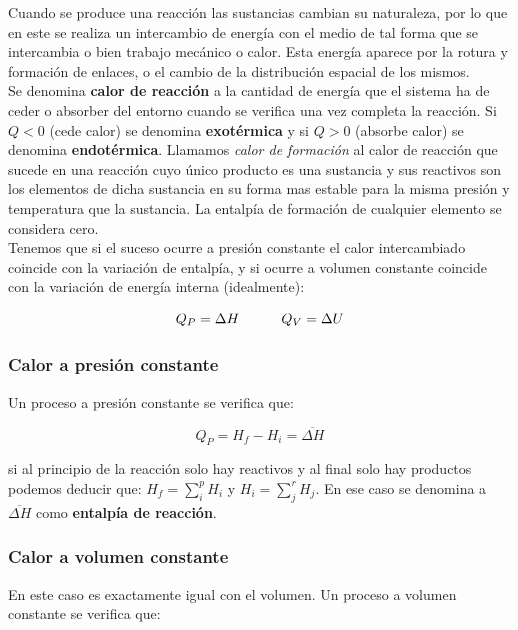 \documentclass[12pt,a4paper,oneside]{book}
\begin{document}
Cuando se produce una reacción las sustancias cambian su naturaleza, por lo que en este se realiza un intercambio de energía con el medio de tal forma que se intercambia o bien trabajo mecánico o calor. Esta energía aparece por la rotura y formación de enlaces, o el cambio de la distribución espacial de los mismos. \\

Se denomina \textbf{calor de reacción} a la cantidad de energía que el sistema ha de ceder o absorber del entorno cuando se verifica una vez completa la reacción. Si $Q<0$ (cede calor) se denomina \textbf{exotérmica} y si $Q>0$ (absorbe calor) se denomina \textbf{endotérmica}. Llamamos \textit{calor de formación} al calor de reacción que sucede en una reacción cuyo único producto es una sustancia y sus reactivos son los elementos de dicha sustancia en su forma mas estable para la misma presión y temperatura que la sustancia. La entalpía de formación de cualquier elemento se considera cero.
 \\

Tenemos que si el suceso ocurre a presión constante el calor intercambiado coincide con la variación de entalpía, y si ocurre a volumen constante coincide con la variación de energía interna (idealmente):

\begin{equation}
Q_P = \Delta H  \quad \quad \quad Q_V = \Delta U
\end{equation}

\subsubsection*{Calor a presión constante}

Un proceso a presión constante se verifica que:

\begin{equation}
Q_P = H_f - H_i = \overline{\Delta H}
\end{equation}

si al principio de la reacción solo hay reactivos y al final solo hay productos podemos deducir que: $H_f = \sum_i^p H_i $  y $H_i = \sum_j^r H_j$. En ese caso se denomina a $\overline{\Delta H}$ como \textbf{entalpía de reacción}. 


\subsubsection*{Calor a volumen constante}

En este caso es exactamente igual con el volumen. Un proceso a volumen constante se verifica que:
\end{document}
